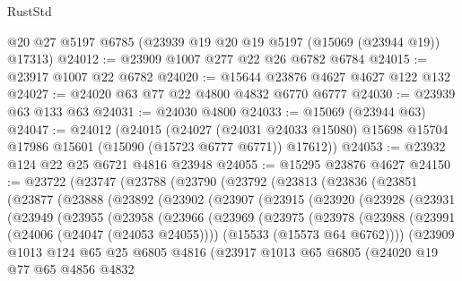 \begin{lexlean}{RustStd}
\begin{coremodule}
    @20
    @27
    @5197
    @6785
    (@23939 @19 @20 @19 @5197 (@15069 (@23944 @19)) @17313)
@24012 := @23909 @1007 @277 @22 @26 @6782 @6784
@24015 := @23917 @1007 @22 @6782
@24020 := @15644 @23876 @4627 @4627 @122 @132
@24027 := @24020 @63 @77 @22 @4800 @4832 @6770 @6777
@24030 := @23939 @63 @133 @63
@24031 := @24030 @4800
@24033 := @15069 (@23944 @63)
@24047 := @24012
    (@24015
      (@24027
        (@24031 @24033 @15080)
        @15698
        @15704
        @17986
        @15601
        (@15090 (@15723 @6777 @6771))
        @17612))
@24053 := @23932 @124 @22 @25 @6721 @4816 @23948
@24055 := @15295 @23876 @4627
@24150 := @23722
    (@23747
      (@23788
        (@23790
          (@23792
            (@23813
              (@23836
                (@23851
                  (@23877
                    (@23888
                      (@23892
                        (@23902
                          (@23907
                            (@23915
                              (@23920
                                (@23928
                                  (@23931
                                    (@23949
                                      (@23955
                                        (@23958
                                          (@23966
                                            (@23969
                                              (@23975
                                                (@23978
                                                  (@23988
                                                    (@23991 (@24006 (@24047 (@24053 @24055))))
                                                    (@15533 (@15573 @64 @6762))))
                                                (@23909
                                                  @1013
                                                  @124
                                                  @65
                                                  @25
                                                  @6805
                                                  @4816
                                                  (@23917
                                                    @1013
                                                    @65
                                                    @6805
                                                    (@24020
                                                      @19
                                                      @77
                                                      @65
                                                      @4856
                                                      @4832

\end{coremodule}
\end{lexlean}
